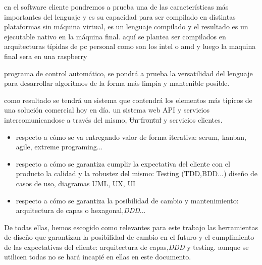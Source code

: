 

en el software cliente pondremos a prueba una de las características más importantes del lenguaje y es su capacidad para ser compilado en distintas plataformas sin máquina virtual, es un lenguaje compilado y el resultado es un ejecutable nativo en la máquina final. aquí se plantea ser compilados en arquitecturas típidas de pc personal como son los intel o amd y luego la maquina final sera en una raspberry 


programa de control automático, se pondrá a prueba la versatilidad del lenguaje para desarrollar algoritmos de la forma más limpia y mantenible posible.


como resultado se tendrá un sistema que contendrá los elementos más tipicos de una solución comercial hoy en día. un sistema web API y servicios intercomunicandose a través del mismo, \sout{Un frontal} y servicios clientes.


\begin{itemize}
	\item respecto a cómo se va entregando valor de forma iterativa: scrum, kanban, agile, extreme programing...
	\item respecto a cómo se garantiza cumplir la expectativa del cliente con el producto la calidad y la robustez del mismo: Testing (TDD,BDD...) diseño de casos de uso, diagramas UML, UX, UI
	\item respecto a cómo se garantiza la posibilidad de cambio y mantenimiento: arquitectura de capas o hexagonal,\textit{DDD}...
\end{itemize} 

De todas ellas, hemos escogido como relevantes para este trabajo las herramientas de diseño que garantizan la posibilidad de cambio en el futuro y el cumplimiento de las expectativas del cliente: arquitectura de capas,\textit{DDD} y testing. aunque se utilicen todas no se hará incapié en ellas en este documento.


